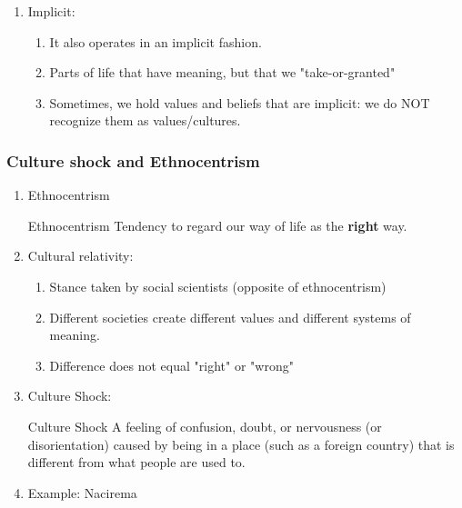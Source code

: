 \documentclass[12pt,a4paper]{article}
\begin{document}
\begin{enumerate}
\begin{enumerate}
\begin{enumerate}
			\item Culture operates in an explicit fashion.
			\item Areas that explicitly/obviously deal with meaning.
			\item Material culture
			\item Values/Beliefs: 
			\begin{itemize}
				\item Beliefs that people share regarding what is good, beautiful. 
				\item Values define what is worthwhile, important. 
			\end{itemize}
		\end{enumerate}
		\item Implicit: 
		\begin{enumerate}
			\item It also operates in an implicit fashion. 
			\item Parts of life that have meaning, but that we "take-or-granted"
			\item Sometimes, we hold values and beliefs that are implicit: we do NOT recognize them as values/cultures. 
		\end{enumerate}
	\end{enumerate}
\end{enumerate}

\subsubsection{Culture shock and Ethnocentrism}
\begin{enumerate}
	\item Ethnocentrism
	\begin{df}{Ethnocentrism}
		Tendency to regard our way of life as the \textbf{right} way. 
	\end{df}
	\item Cultural relativity: 
	\begin{enumerate}
		\item Stance taken by social scientists (opposite of ethnocentrism)
		\item Different societies create different values and different systems of meaning. 
		\item Difference does not equal "right" or "wrong"
	\end{enumerate}
	\item Culture Shock: 
	\begin{df}{Culture Shock}
		A feeling of confusion, doubt, or nervousness (or disorientation) caused by being in a place (such as a foreign country) that is different from what people are used to.
	\end{df}
	\item Example: Nacirema
\end{enumerate}
 
\end{document}
